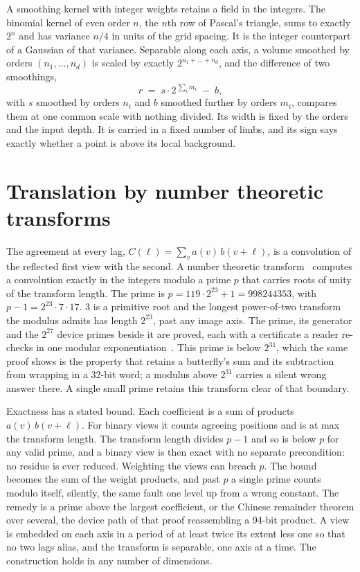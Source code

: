 A smoothing kernel with integer weights retains a field in the integers. The binomial kernel of even
order \(n\), the \(n\)th row of Pascal's triangle, sums to exactly \(2^n\) and has variance \(n/4\) in units of
the grid spacing. It is the integer counterpart of a Gaussian of that variance. Separable along each
axis, a volume smoothed by orders \((n_1, \dots, n_d)\) is scaled by exactly \(2^{n_1 + \dots + n_d}\), and
the difference of two smoothings,
\[
r \;=\; s \cdot 2^{\,\sum_i m_i} \;-\; b,
\]
with \(s\) smoothed by orders \(n_i\) and \(b\) smoothed further by orders \(m_i\), compares them at one common
scale with nothing divided. Its width is fixed by the orders and the input depth. It is carried in a
fixed number of limbs, and its sign says exactly whether a point is above its local background.

\section{Translation by number theoretic transforms}

The agreement at every lag, \(C(\ell) = \sum_v a(v)\, b(v + \ell)\), is a convolution of the reflected
first view with the second. A number theoretic transform~\cite{src:DTIC-ADA013395,src:S1076567008702167} computes a convolution exactly in the
integers modulo a prime \(p\) that carries roots of unity of the transform length. The prime is
\(p = 119 \cdot 2^{23} + 1 = 998244353\), with \(p - 1 = 2^{23} \cdot 7 \cdot 17\). 3 is a primitive
root and the longest power-of-two transform the modulus admits has length \(2^{23}\), past any image
axis. The prime, its generator and the \(2^{27}\) device primes beside it are proved, each with a
certificate a reader re-checks in one modular exponentiation~\cite{src:Quigg-twiddle-constants}. This prime is below \(2^{31}\),
which the same proof shows is the property that retains a butterfly's sum and its subtraction from
wrapping in a 32-bit word; a modulus above \(2^{31}\) carries a silent wrong answer there. A single
small prime retains this transform clear of that boundary.

Exactness has a stated bound. Each coefficient is a sum of products \(a(v)\, b(v + \ell)\). For binary
views it counts agreeing positions and is at max the transform length. The transform length divides
\(p - 1\) and so is below \(p\) for any valid prime, and a binary view is then exact with no separate
precondition: no residue is ever reduced. Weighting the views can breach \(p\). The bound becomes
the sum of the weight products, and past \(p\) a single prime counts modulo itself, silently, the same
fault one level up from a wrong constant. The remedy is a prime above the largest coefficient, or the
Chinese remainder theorem over several, the device path of that proof reassembling a 94-bit product. A
view is embedded on each axis in a period of at least twice its extent less one so that no two lags
alias, and the transform is separable, one axis at a time. The construction holds in any number of
dimensions.

